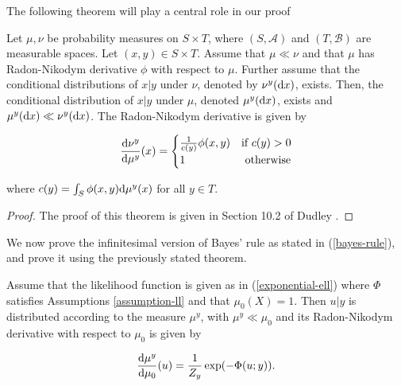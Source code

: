 The following theorem will play a central role in our proof

\begin{theorem}
  \label{duley}
  Let $\mu, \nu$ be probability measures on $S \times T$, where $(S, \mathcal{A})$ and $(T, \mathcal{B})$ are measurable spaces. Let $(x, y) \in S \times T$. Assume that $\mu \ll \nu$ and that $\mu$ has Radon-Nikodym derivative $\phi$ with respect to $\mu$. Further assume that the conditional distributions of $x|y$ under $\nu$, denoted by $\nu^y(\text{d} x)$, exists. Then, the conditional distribution of $x|y$ under $\mu$, denoted $\mu^y(\text{d} x)$, exists and $\mu^y(\text{d} x) \ll \nu^y(\text{d} x)$. The Radon-Nikodym derivative is given by

  \begin{equation}
    \frac{\text{d} \nu^y}{\text{d} \mu^y}(x) =  \begin{cases}
      \frac1{c(y)}\phi(x,y) & \text{if $c(y) > 0$}\\
      1 & \text{ otherwise}
    \end{cases}  
  \end{equation}

  where $c(y) = \int_{S}\phi(x,y)\text{d} \mu^y(x)$ for all $y \in T$.
\end{theorem}

\begin{proof}
  The proof of this theorem is given in Section 10.2 of Dudley \cite{dudley_2002}.
\end{proof}

We now prove the infinitesimal version of Bayes' rule as stated in (\ref{bayes-rule}), and prove it using the previously stated theorem.

\begin{theorem}
  Assume that the likelihood function is given as in (\ref{exponential-ell}) where $\Phi$ satisfies Assumptions \ref{assumption-ll} and that $\mu_0(X) = 1$. Then $u | y$ is distributed according to the measure $\mu^y$, with $\mu^y \ll \mu_0$ and its Radon-Nikodym derivative with respect to $\mu_0$ is given by

  \begin{equation}
    \frac{\text{d} \mu^y}{\text{d} \mu_0}(u) = \frac1{Z_y}\exp(-\Phi(u;y)).
  \end{equation}
\end{theorem}

